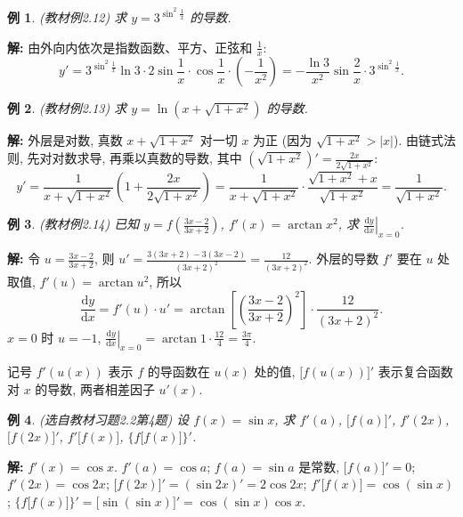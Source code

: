 \documentclass[UTF8,openany]{ctexbook}
\theoremstyle{chinesetextbook}
\newtheorem{example}{例}[section]
\newenvironment{cnsolution}{\par\indent\textbf{解:} \ignorespaces}{\par}
\newcommand{\dd}{\mathrm d}
\begin{document}
\begin{example}\label{ex:c2-2-12}
\textnormal{(教材例2.12)} 求 $y=3^{\sin^2\frac1x}$ 的导数.
\end{example}
\begin{cnsolution}
由外向内依次是指数函数、平方、正弦和 $\displaystyle\frac1x$:
\[
y'=3^{\sin^2\frac1x}\ln3\cdot2\sin\frac1x\cdot\cos\frac1x\cdot\left(-\frac1{x^2}\right)=-\frac{\ln3}{x^2}\sin\frac2x\cdot3^{\sin^2\frac1x}.
\]
\end{cnsolution}
\begin{example}\label{ex:c2-2-13}
\textnormal{(教材例2.13)} 求 $y=\ln\left(x+\sqrt{1+x^2}\right)$ 的导数.
\end{example}
\begin{cnsolution}
外层是对数, 真数 $x+\sqrt{1+x^2}$ 对一切 $x$ 为正 (因为 $\sqrt{1+x^2}>|x|$). 由链式法则, 先对对数求导, 再乘以真数的导数, 其中 $\displaystyle\left(\sqrt{1+x^2}\right)'=\frac{2x}{2\sqrt{1+x^2}}$:
\[
y'=\frac1{x+\sqrt{1+x^2}}\left(1+\frac{2x}{2\sqrt{1+x^2}}\right)=\frac1{x+\sqrt{1+x^2}}\cdot\frac{\sqrt{1+x^2}+x}{\sqrt{1+x^2}}=\frac1{\sqrt{1+x^2}}.
\]
\end{cnsolution}
\begin{example}\label{ex:c2-2-14}
\textnormal{(教材例2.14)} 已知 $\displaystyle y=f\left(\frac{3x-2}{3x+2}\right)$, $f'(x)=\arctan x^2$, 求 $\displaystyle\left.\frac{\dd y}{\dd x}\right|_{x=0}$.
\end{example}
\begin{cnsolution}
令 $\displaystyle u=\frac{3x-2}{3x+2}$, 则 $\displaystyle u'=\frac{3(3x+2)-3(3x-2)}{(3x+2)^2}=\frac{12}{(3x+2)^2}$. 外层的导数 $f'$ 要在 $u$ 处取值, $f'(u)=\arctan u^2$, 所以
\[
\frac{\dd y}{\dd x}=f'(u)\cdot u'=\arctan\left[\left(\frac{3x-2}{3x+2}\right)^2\right]\cdot\frac{12}{(3x+2)^2}.
\]
$x=0$ 时 $u=-1$, $\displaystyle\left.\frac{\dd y}{\dd x}\right|_{x=0}=\arctan1\cdot\frac{12}4=\frac{3\pi}4$.
\end{cnsolution}
记号 $f'(u(x))$ 表示 $f$ 的导函数在 $u(x)$ 处的值, $\bigl[f(u(x))\bigr]'$ 表示复合函数对 $x$ 的导数, 两者相差因子 $u'(x)$.
\begin{example}\label{ex:c2-h2-4}
\textnormal{(选自教材习题2.2第4题)} 设 $f(x)=\sin x$, 求 $f'(a)$, $\bigl[f(a)\bigr]'$, $f'(2x)$, $\bigl[f(2x)\bigr]'$, $f'\bigl[f(x)\bigr]$, $\bigl\{f\bigl[f(x)\bigr]\bigr\}'$.
\end{example}
\begin{cnsolution}
$f'(x)=\cos x$. $f'(a)=\cos a$; $f(a)=\sin a$ 是常数, $\bigl[f(a)\bigr]'=0$; $f'(2x)=\cos2x$; $\bigl[f(2x)\bigr]'=(\sin2x)'=2\cos2x$; $f'\bigl[f(x)\bigr]=\cos(\sin x)$; $\bigl\{f\bigl[f(x)\bigr]\bigr\}'=\bigl[\sin(\sin x)\bigr]'=\cos(\sin x)\cos x$.
\end{cnsolution}
\end{document}
